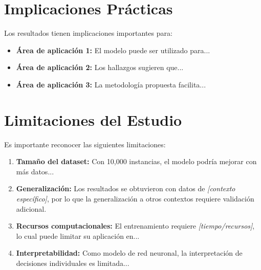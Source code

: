 \section{Implicaciones Prácticas}
\label{sec:implicaciones}

Los resultados tienen implicaciones importantes para:

\begin{itemize}
    \item \textbf{Área de aplicación 1:} El modelo puede ser utilizado para...
    \item \textbf{Área de aplicación 2:} Los hallazgos sugieren que...
    \item \textbf{Área de aplicación 3:} La metodología propuesta facilita...
\end{itemize}

\section{Limitaciones del Estudio}
\label{sec:limitaciones}

Es importante reconocer las siguientes limitaciones:

\begin{enumerate}
    \item \textbf{Tamaño del dataset:} Con 10,000 instancias, el modelo podría mejorar con más datos...
    
    \item \textbf{Generalización:} Los resultados se obtuvieron con datos de \textit{[contexto específico]}, por lo que la generalización a otros contextos requiere validación adicional.
    
    \item \textbf{Recursos computacionales:} El entrenamiento requiere \textit{[tiempo/recursos]}, lo cual puede limitar su aplicación en...
    
    \item \textbf{Interpretabilidad:} Como modelo de red neuronal, la interpretación de decisiones individuales es limitada...
\end{enumerate}

